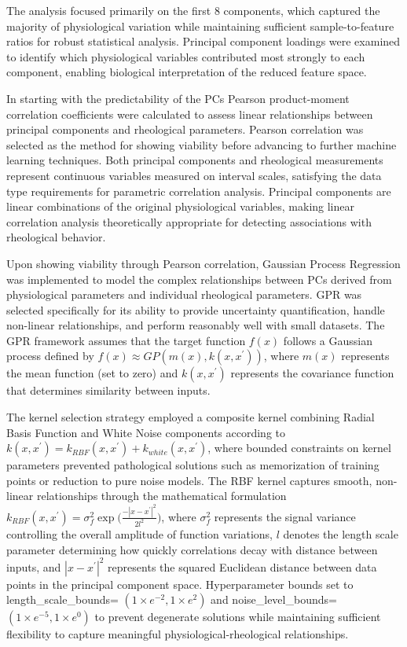 \documentclass[12pt,letterpaper]{article}
\begin{document}
The analysis focused primarily on the first 8 components, which captured the majority of physiological variation while maintaining sufficient sample-to-feature ratios for
robust statistical analysis. Principal component loadings were examined to identify which physiological variables contributed most strongly to each component, enabling biological
interpretation of the reduced feature space.

In starting with the predictability of the PCs Pearson product-moment correlation coefficients were calculated to assess linear relationships between principal components and
rheological parameters. Pearson correlation was selected as the method for showing viability before advancing to further machine learning techniques. Both principal components
and rheological measurements represent continuous variables measured on interval scales, satisfying the data type requirements for parametric correlation analysis.
Principal components are linear combinations of the original physiological variables, making linear correlation analysis theoretically appropriate for detecting associations
with rheological behavior.

Upon showing viability through Pearson correlation, Gaussian Process Regression was implemented to model the complex relationships between PCs derived from physiological
parameters and individual rheological parameters. GPR was selected specifically for its ability to provide uncertainty quantification, handle non-linear relationships,
and perform reasonably well with small datasets. The GPR framework assumes that the target function $f(x)$ follows a Gaussian process defined by $f(x) \approx GP(m(x), k(x,x^{\prime}))$,
where $m(x)$ represents the mean function (set to zero) and $k(x,x^{\prime})$ represents the covariance function that determines similarity between inputs.

The kernel selection strategy employed a composite kernel combining Radial Basis Function and White Noise components according to $k(x,x^\prime)=k_{RBF}(x,x^\prime)+k_{white}(x,x^\prime)$,
where bounded constraints on kernel parameters prevented pathological solutions such as memorization of training points or reduction to pure noise models. The RBF kernel captures smooth,
non-linear relationships through the mathematical formulation $k_{RBF}(x,x^{\prime}) = \sigma^2_f \exp\Big(\frac{-|x-x^{\prime}|^2}{2l^2}\Big)$, where $\sigma^2_f $
represents the signal variance controlling the overall amplitude of function variations, $l$ denotes the length scale parameter determining how quickly correlations decay with
distance between inputs, and $|x-x^{\prime}|^2$ represents the squared Euclidean distance between data points in the principal component space. Hyperparameter bounds set to
length\_scale\_bounds= $(1\times e^{-2}, 1\times e^2)$ and noise\_level\_bounds= $(1\times e^{-5}, 1\times e^0)$ to prevent degenerate solutions while maintaining sufficient
flexibility to capture meaningful physiological-rheological relationships.
\end{document}
